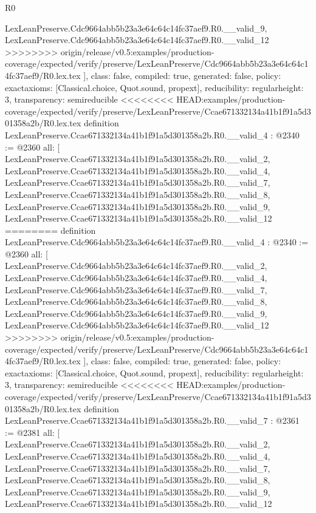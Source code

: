 \begin{lexlean}{R0}
\begin{coremodule}
{{{{{{{{{{{{{{{{{{{{{{{{{{{{{{{{{{{{{{{{{{{{{    LexLeanPreserve.Cdc9664abb5b23a3e64c64c14fc37aef9.R0.__valid_9,
    LexLeanPreserve.Cdc9664abb5b23a3e64c64c14fc37aef9.R0.__valid_12
>>>>>>>> origin/release/v0.5:examples/production-coverage/expected/verify/preserve/LexLeanPreserve/Cdc9664abb5b23a3e64c64c14fc37aef9/R0.lex.tex
  ],
  class: false,
  compiled: true,
  generated: false,
  policy: exact{axioms: [Classical.choice, Quot.sound, propext]},
  reducibility: regular{height: 3},
  transparency: semireducible
}
<<<<<<<< HEAD:examples/production-coverage/expected/verify/preserve/LexLeanPreserve/Ccae671332134a41b1f91a5d301358a2b/R0.lex.tex
definition LexLeanPreserve.Ccae671332134a41b1f91a5d301358a2b.R0.__valid_4 : @2340 := @2360 {
  all: [
    LexLeanPreserve.Ccae671332134a41b1f91a5d301358a2b.R0.__valid_2,
    LexLeanPreserve.Ccae671332134a41b1f91a5d301358a2b.R0.__valid_4,
    LexLeanPreserve.Ccae671332134a41b1f91a5d301358a2b.R0.__valid_7,
    LexLeanPreserve.Ccae671332134a41b1f91a5d301358a2b.R0.__valid_8,
    LexLeanPreserve.Ccae671332134a41b1f91a5d301358a2b.R0.__valid_9,
    LexLeanPreserve.Ccae671332134a41b1f91a5d301358a2b.R0.__valid_12
========
definition LexLeanPreserve.Cdc9664abb5b23a3e64c64c14fc37aef9.R0.__valid_4 : @2340 := @2360 {
  all: [
    LexLeanPreserve.Cdc9664abb5b23a3e64c64c14fc37aef9.R0.__valid_2,
    LexLeanPreserve.Cdc9664abb5b23a3e64c64c14fc37aef9.R0.__valid_4,
    LexLeanPreserve.Cdc9664abb5b23a3e64c64c14fc37aef9.R0.__valid_7,
    LexLeanPreserve.Cdc9664abb5b23a3e64c64c14fc37aef9.R0.__valid_8,
    LexLeanPreserve.Cdc9664abb5b23a3e64c64c14fc37aef9.R0.__valid_9,
    LexLeanPreserve.Cdc9664abb5b23a3e64c64c14fc37aef9.R0.__valid_12
>>>>>>>> origin/release/v0.5:examples/production-coverage/expected/verify/preserve/LexLeanPreserve/Cdc9664abb5b23a3e64c64c14fc37aef9/R0.lex.tex
  ],
  class: false,
  compiled: true,
  generated: false,
  policy: exact{axioms: [Classical.choice, Quot.sound, propext]},
  reducibility: regular{height: 3},
  transparency: semireducible
}
<<<<<<<< HEAD:examples/production-coverage/expected/verify/preserve/LexLeanPreserve/Ccae671332134a41b1f91a5d301358a2b/R0.lex.tex
definition LexLeanPreserve.Ccae671332134a41b1f91a5d301358a2b.R0.__valid_7 : @2361 := @2381 {
  all: [
    LexLeanPreserve.Ccae671332134a41b1f91a5d301358a2b.R0.__valid_2,
    LexLeanPreserve.Ccae671332134a41b1f91a5d301358a2b.R0.__valid_4,
    LexLeanPreserve.Ccae671332134a41b1f91a5d301358a2b.R0.__valid_7,
    LexLeanPreserve.Ccae671332134a41b1f91a5d301358a2b.R0.__valid_8,
    LexLeanPreserve.Ccae671332134a41b1f91a5d301358a2b.R0.__valid_9,
    LexLeanPreserve.Ccae671332134a41b1f91a5d301358a2b.R0.__valid_12
}}}}}}}}}}}}}}}}}}}}}}}}}}}}}}}}}}}}}}}}}}}}}}
\end{coremodule}
\end{lexlean}
